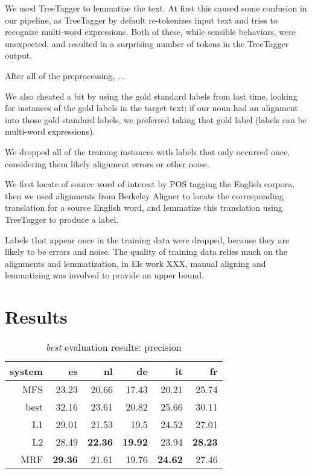 \documentclass[11pt,letterpaper]{article}
\begin{document}
We used TreeTagger \cite{Schmid95improvementsin} to lemmatize the text. At
first this caused some confusion in our pipeline, as TreeTagger by default
re-tokenizes input text and tries to recognize multi-word expressions. Both of
these, while sensible behaviors, were unexpected, and resulted in a surprising 
number of tokens in the TreeTagger output.

After all of the preprocessing,  ...

We also cheated a bit by using the gold standard labels from last time, looking
for instances of the gold labels in the target text; if our noun had an
alignment into those gold standard labels, we preferred taking that gold label
(labels can be multi-word expressions).

We dropped all of the training instances with labels that only occurred once,
considering them likely alignment errors or other noise.

We first locate of source word of interest by POS tagging the English corpora,
then we used alignments from Berkeley Aligner to locate the corresponding
translation for a source English word, and lemmatize this translation using
TreeTagger to produce a label.

Labels that appear once in the training data were dropped, because they are likely to be errors and noise.
The quality of training data relies much on the alignments and lemmatization, in Els work XXX, manual aligning and lemmatizing was involved to provide an upper bound.



\section{Results}
\begin{table}[t!]
  \begin{center}
    \begin{tabular}{|r|r|r|r|r|r|}
      \hline
      system   & es    & nl    & de    &  it   & fr \\
      \hline
   MFS  & 23.23          & 20.66          & 17.43          & 20.21          & 25.74 \\
   best & 32.16          & 23.61          & 20.82          & 25.66          & 30.11 \\
      \hline
            L1 & 29.01          & 21.53          & 19.5           & 24.52          & 27.01 \\
            L2 & 28.49          & \textbf{22.36} & \textbf{19.92} & 23.94          & \textbf{28.23} \\
           MRF & \textbf{29.36} & 21.61          & 19.76          & \textbf{24.62} & 27.46 \\
      \hline
    \end{tabular}
  \caption{\emph{best} evaluation results: precision}
  \label{table:resultsbest}
  \end{center}
\end{table}
\end{document}

